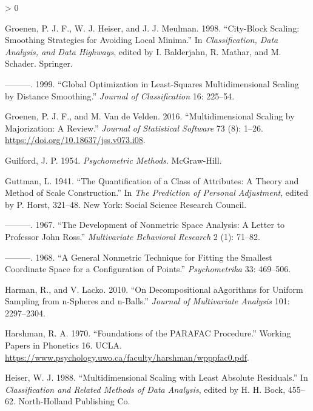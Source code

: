 \documentclass[
  12pt,
]{book}
\newlength{\cslhangindent}
\newenvironment{CSLReferences}[2] %
 {%
  \setlength{\parindent}{0pt}
  \ifodd #1 \everypar{\setlength{\hangindent}{\cslhangindent}}\ignorespaces\fi
  \ifnum #2 > 0
  \setlength{\parskip}{#2\baselineskip}
  \fi
 }%
 {}
\theoremstyle{definition}
\theoremstyle{definition}
\theoremstyle{definition}
\theoremstyle{definition}
\theoremstyle{remark}
\begin{document}
\begin{CSLReferences}{1}{0}
\leavevmode\hypertarget{ref-groenen_heiser_meulman_98}{}%
Groenen, P. J. F., W. J. Heiser, and J. J. Meulman. 1998. {``{City-Block Scaling: Smoothing Strategies for Avoiding Local Minima}.''} In \emph{Classification, Data Analysis, and Data Highways}, edited by I. Balderjahn, R. Mathar, and M. Schader. Springer.

\leavevmode\hypertarget{ref-groenen_heiser_meulman_99}{}%
---------. 1999. {``{Global Optimization in Least-Squares Multidimensional Scaling by Distance Smoothing}.''} \emph{Journal of Classification} 16: 225--54.

\leavevmode\hypertarget{ref-groenen_vandevelden_16}{}%
Groenen, P. J. F., and M. Van de Velden. 2016. {``{Multidimensional Scaling by Majorization: A Review}.''} \emph{Journal of Statistical Software} 73 (8): 1--26. \url{https://doi.org/10.18637/jss.v073.i08}.

\leavevmode\hypertarget{ref-guilford_54}{}%
Guilford, J. P. 1954. \emph{Psychometric Methods}. McGraw-Hill.

\leavevmode\hypertarget{ref-guttman_41}{}%
Guttman, L. 1941. {``{The Quantification of a Class of Attributes: A Theory and Method of Scale Construction}.''} In \emph{The Prediction of Personal Adjustment}, edited by P. Horst, 321--48. New York: Social Science Research Council.

\leavevmode\hypertarget{ref-guttman_67}{}%
---------. 1967. {``{The Development of Nonmetric Space Analysis: A Letter to Professor John Ross}.''} \emph{Multivariate Behavioral Research} 2 (1): 71--82.

\leavevmode\hypertarget{ref-guttman_68}{}%
---------. 1968. {``{A General Nonmetric Technique for Fitting the Smallest Coordinate Space for a Configuration of Points}.''} \emph{Psychometrika} 33: 469--506.

\leavevmode\hypertarget{ref-harman_lacko_10}{}%
Harman, R., and V. Lacko. 2010. {``{On Decompositional aAgorithms for Uniform Sampling from n-Spheres and n-Balls}.''} \emph{Journal of Multivariate Analysis} 101: 2297--2304.

\leavevmode\hypertarget{ref-harshman_70}{}%
Harshman, R. A. 1970. {``{Foundations of the PARAFAC Procedure}.''} Working Papers in Phonetics 16. UCLA. \url{https://www.psychology.uwo.ca/faculty/harshman/wpppfac0.pdf}.

\leavevmode\hypertarget{ref-heiser_88}{}%
Heiser, W. J. 1988. {``{Multidimensional Scaling with Least Absolute Residuals}.''} In \emph{Classification and Related Methods of Data Analysis}, edited by H. H. Bock, 455--62. North-Holland Publishing Co.


\end{CSLReferences}
\end{document}
